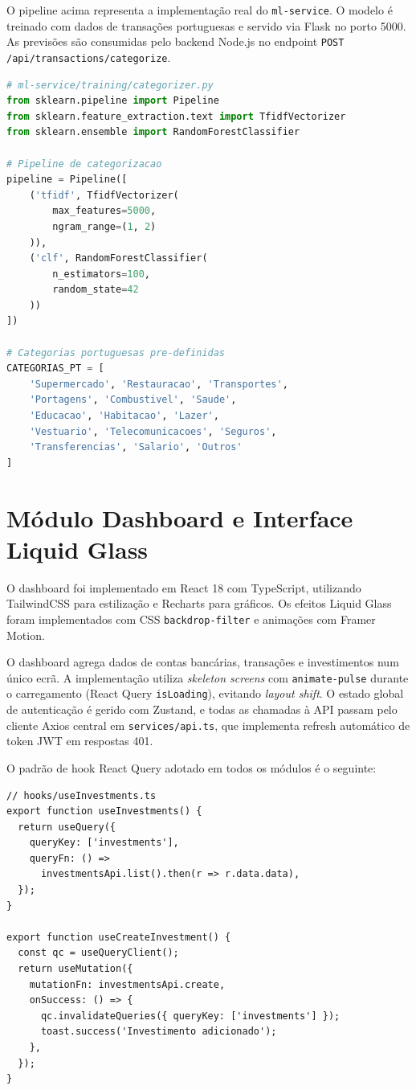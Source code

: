 O pipeline acima representa a implementação real do \texttt{ml-service}. O modelo é treinado com dados de transações portuguesas e servido via Flask no porto 5000. As previsões são consumidas pelo backend Node.js no endpoint \texttt{POST /api/transactions/categorize}.

\begin{lstlisting}[caption={Pipeline de categorização (simplificado).},label={lst:ml},language=Python]
# ml-service/training/categorizer.py
from sklearn.pipeline import Pipeline
from sklearn.feature_extraction.text import TfidfVectorizer
from sklearn.ensemble import RandomForestClassifier

# Pipeline de categorizacao
pipeline = Pipeline([
    ('tfidf', TfidfVectorizer(
        max_features=5000,
        ngram_range=(1, 2)
    )),
    ('clf', RandomForestClassifier(
        n_estimators=100,
        random_state=42
    ))
])

# Categorias portuguesas pre-definidas
CATEGORIAS_PT = [
    'Supermercado', 'Restauracao', 'Transportes',
    'Portagens', 'Combustivel', 'Saude',
    'Educacao', 'Habitacao', 'Lazer',
    'Vestuario', 'Telecomunicacoes', 'Seguros',
    'Transferencias', 'Salario', 'Outros'
]
\end{lstlisting}


\section{Módulo Dashboard e Interface Liquid Glass}
\label{sec:impl-dashboard}

O dashboard foi implementado em React 18 com TypeScript, utilizando TailwindCSS para estilização e Recharts para gráficos. Os efeitos Liquid Glass foram implementados com CSS \texttt{backdrop-filter} e animações com Framer Motion.

O dashboard agrega dados de contas bancárias, transações e investimentos num único ecrã. A implementação utiliza \textit{skeleton screens} com \texttt{animate-pulse} durante o carregamento (React Query \texttt{isLoading}), evitando \textit{layout shift}. O estado global de autenticação é gerido com Zustand, e todas as chamadas à API passam pelo cliente Axios central em \texttt{services/api.ts}, que implementa refresh automático de token JWT em respostas 401.

O padrão de hook React Query adotado em todos os módulos é o seguinte:

\begin{lstlisting}[caption={Padrão de hook React Query (exemplo: useInvestments).},label={lst:reactquery}]
// hooks/useInvestments.ts
export function useInvestments() {
  return useQuery({
    queryKey: ['investments'],
    queryFn: () =>
      investmentsApi.list().then(r => r.data.data),
  });
}

export function useCreateInvestment() {
  const qc = useQueryClient();
  return useMutation({
    mutationFn: investmentsApi.create,
    onSuccess: () => {
      qc.invalidateQueries({ queryKey: ['investments'] });
      toast.success('Investimento adicionado');
    },
  });
}
\end{lstlisting}


